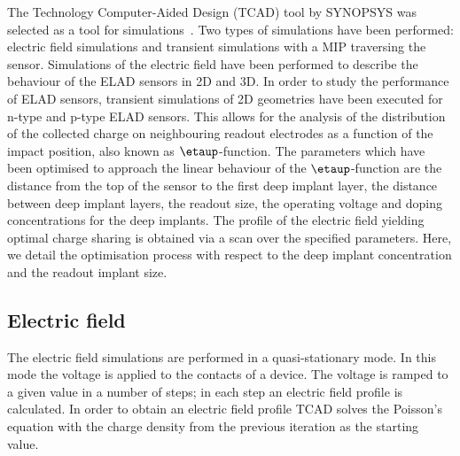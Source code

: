 \documentclass[a4paper,11pt]{article}
\begin{document}
The Technology Computer-Aided Design (TCAD) tool by SYNOPSYS was selected as a tool for simulations~\cite{syn}.
Two types of simulations have been performed: electric field simulations and transient simulations with a MIP traversing the sensor.
Simulations of the electric field have been performed to describe the behaviour of the ELAD sensors in 2D and 3D.
In order to study the performance of ELAD sensors, transient simulations of 2D geometries have been executed for n-type and p-type ELAD sensors.
This allows for the analysis of the distribution of the collected charge on neighbouring readout electrodes as a function of the impact position, also known as $\etaup$-function.
The parameters which have been optimised to approach the linear behaviour of the $\etaup$-function are the distance from the top of the sensor to the first deep implant layer, the distance between deep implant layers,
 the readout size, the operating voltage and doping concentrations for the deep implants. 
The profile of the electric field yielding optimal charge sharing is obtained via a scan over the specified parameters.
Here, we detail the optimisation process with respect to the deep implant concentration and the readout implant size.

\subsection{Electric field}
\label{sec:ef}
The electric field simulations are performed in a quasi-stationary mode.
In this mode the voltage is applied to the contacts of a device.
The voltage is ramped to a given value in a number of steps; in each step an electric field profile is calculated. 
In order to obtain an electric field profile TCAD solves the Poisson's equation with the charge density from the previous iteration as the starting value.
\end{document}

